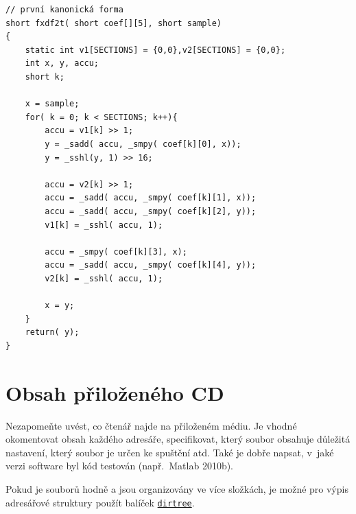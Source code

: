 \noindent
\begin{minipage}{\linewidth}



\begin{lstlisting}[frame=single,numbers=right,caption={Příklad implementace první kanonické formy v~jazyce C.},label=lst:priklad.vypis.kodu.C,basicstyle=\ttfamily\small, keywordstyle=\color{black}\bfseries\underbar,]
// první kanonická forma
short fxdf2t( short coef[][5], short sample)
{
	static int v1[SECTIONS] = {0,0},v2[SECTIONS] = {0,0};
	int x, y, accu;
	short k;

	x = sample;
	for( k = 0; k < SECTIONS; k++){
		accu = v1[k] >> 1;
		y = _sadd( accu, _smpy( coef[k][0], x));
		y = _sshl(y, 1) >> 16;

		accu = v2[k] >> 1;
		accu = _sadd( accu, _smpy( coef[k][1], x));
		accu = _sadd( accu, _smpy( coef[k][2], y));
		v1[k] = _sshl( accu, 1);

		accu = _smpy( coef[k][3], x);
		accu = _sadd( accu, _smpy( coef[k][4], y));
		v2[k] = _sshl( accu, 1);

		x = y;
	}
	return( y);
}
\end{lstlisting}
\end{minipage}







\chapter{Obsah přiloženého CD}
Nezapomeňte uvést, co čtenář najde na přiloženém médiu.
Je vhodné okomentovat obsah každého adresáře, specifikovat, který soubor obsahuje důležitá nastavení, který soubor je určen ke spuštění atd.
Také je dobře napsat, v~jaké verzi software byl kód testován (např.\ Matlab 2010b).

Pokud je souborů hodně a jsou organizovány ve více složkách,  je možné pro výpis adresářové struktury použít balíček \href{https://www.ctan.org/pkg/dirtree}{\texttt{dirtree}}.

